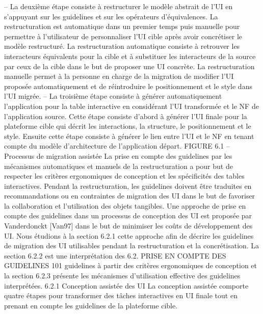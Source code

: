 \documentclass{article}
\begin{document}
– La deuxi\`{e}me \'{e}tape consiste \`{a} restructurer le mod\`{e}le abstrait de l’UI en s’appuyant sur les
guidelines et sur les op\'{e}rateurs d’\'{e}quivalences. La restructuration est automatique dans un premier temps puis manuelle pour permettre \`{a} l’utilisateur de personnaliser l’UI cible apr\`{e}s avoir
concr\'{e}tiser le mod\`{e}le restructur\'{e}. La restructuration automatique consiste \`{a} retrouver les interacteurs \'{e}quivalents pour la cible et \`{a} substituer les interacteurs de la source par ceux de la
cible dans le but de proposer une UI concr\`{e}te. La restructuration manuelle permet \`{a} la personne en charge de la migration de modiﬁer l’UI propos\'{e}e automatiquement et de r\'{e}introduire
le positionnement et le style dans l’UI migr\'{e}e.
– La troisi\`{e}me \'{e}tape consiste \`{a} g\'{e}n\'{e}rer automatiquement l’application pour la table interactive
en consid\'{e}rant l’UI transform\'{e}e et le NF de l’application source. Cette \'{e}tape consiste d’abord \`{a}
g\'{e}n\'{e}rer l’UI ﬁnale pour la plateforme cible qui d\'{e}crit les interactions, la structure, le positionnement et le style. Ensuite cette \'{e}tape consiste \`{a} g\'{e}n\'{e}rer le lien entre l’UI et le NF en tenant
compte du mod\`{e}le d’architecture de l’application d\'{e}part.
FIGURE 6.1 – Processus de migration assist\'{e}e
La prise en compte des guidelines par les m\'{e}canismes automatiques et manuels de la restructuration a pour but de respecter les crit\`{e}res ergonomiques de conception et les sp\'{e}ciﬁcit\'{e}s des tables
interactives. Pendant la restructuration, les guidelines doivent \^{e}tre traduites en recommandations ou
en contraintes de migration des UI dans le but de favoriser la collaboration et l’utilisation des objets
tangibles.
Une approche de prise en compte des guidelines dans un processus de conception des UI est
propos\'{e}e par Vanderdonckt [Van97] dans le but de minimiser les co\^{u}ts de d\'{e}veloppement des UI.
Nous \'{e}tudions \`{a} la section 6.2.1 cette approche aﬁn de d\'{e}crire les guidelines de migration des UI
utilisables pendant la restructuration et la concr\'{e}tisation. La section 6.2.2 est une interpr\'{e}tation des
6.2. PRISE EN COMPTE DES GUIDELINES
101
guidelines \`{a} partir des crit\`{e}res ergonomiques de conception et la section 6.2.3 pr\'{e}sente les m\'{e}canismes
d’utilisation effective des guidelines interpr\'{e}t\'{e}es.
6.2.1
Conception assist\'{e}e des UI
La conception assist\'{e}e comporte quatre \'{e}tapes pour transformer des t\^{a}ches interactives en UI
ﬁnale tout en prenant en compte les guidelines de la plateforme cible.
\end{document}
